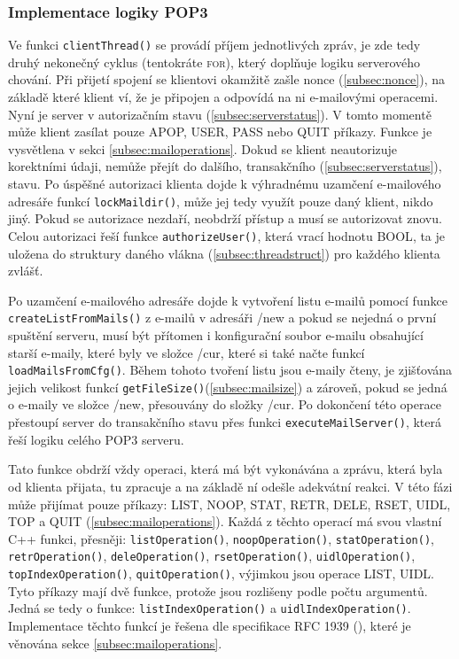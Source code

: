 \documentclass[11pt,a4paper]{report}
\begin{document}
    \subsubsection{Implementace logiky POP3}
    \label{subsec:pop3implementation}
    Ve funkci \texttt{clientThread()} se provádí příjem jednotlivých zpráv, je zde tedy druhý nekonečný cyklus (tentokráte \textsc{for}), který doplňuje logiku serverového chování. Při přijetí spojení se klientovi okamžitě zašle nonce (\ref{subsec:nonce}), na základě které klient ví, že je připojen a odpovídá na ni e-mailovými operacemi. Nyní je server v autorizačním stavu (\ref{subsec:serverstatus}). V tomto momentě může klient zasílat pouze APOP, USER, PASS nebo QUIT příkazy. Funkce je vysvětlena v sekci \ref{subsec:mailoperations}. Dokud se klient neautorizuje korektními údaji, nemůže přejít do dalšího, transakčního (\ref{subsec:serverstatus}), stavu. Po úspěšné autorizaci klienta dojde k výhradnému uzamčení e-mailového adresáře funkcí \texttt{lockMaildir()}, může jej tedy využít pouze daný klient, nikdo jiný. Pokud se autorizace nezdaří, neobdrží přístup a musí se autorizovat znovu. Celou autorizaci řeší funkce \texttt{authorizeUser()}, která vrací hodnotu \textsc{BOOL}, ta je uložena do struktury daného vlákna (\ref{subsec:threadstruct}) pro každého klienta zvlášť. \par
    Po uzamčení e-mailového adresáře dojde k vytvoření listu e-mailů pomocí funkce \texttt{createListFromMails()} z e-mailů v adresáři /new a pokud se nejedná o první spuštění serveru, musí být přítomen i konfigurační soubor e-mailu obsahující starší e-maily, které byly ve složce /cur, které si také načte funkcí \texttt{loadMailsFromCfg()}. Během tohoto tvoření listu jsou e-maily čteny, je zjišťována jejich velikost funkcí \texttt{getFileSize()}(\ref{subsec:mailsize}) a zároveň, pokud se jedná o e-maily ve složce /new, přesouvány do složky /cur. Po dokončení této operace přestoupí server do transakčního stavu přes funkci \texttt{executeMailServer()}, která řeší logiku celého POP3 serveru.\par
    Tato funkce obdrží vždy operaci, která má být vykonávána a zprávu, která byla od klienta přijata, tu zpracuje a na základě ní odešle adekvátní reakci. V této fázi může přijímat pouze příkazy: LIST, NOOP, STAT, RETR, DELE, RSET, UIDL, TOP a QUIT (\ref{subsec:mailoperations}). Každá z těchto operací má svou vlastní C++ funkci, přesněji: \texttt{listOperation()}, \texttt{noopOperation()}, \texttt{statOperation()}, \texttt{retrOperation()}, \texttt{deleOperation()}, \texttt{rsetOperation()}, \texttt{uidlOperation()}, \texttt{topIndexOperation()}, \texttt{quitOperation()}, výjimkou jsou operace LIST, UIDL. Tyto příkazy mají dvě funkce, protože jsou rozlišeny podle počtu argumentů. Jedná se tedy o funkce: \texttt{listIndexOperation()} a \texttt{uidlIndexOperation()}. Implementace těchto funkcí je řešena dle specifikace RFC 1939 (\cite{P3Server}), které je věnována sekce \ref{subsec:mailoperations}.\par
\end{document}
